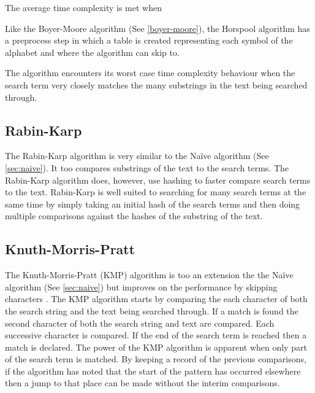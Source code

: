 \documentclass{article}
\begin{document}
The average time complexity is met when 

Like the Boyer-Moore algorithm \citep{Boyer1977} (See \ref{boyer-moore}), the Horspool algorithm has a preprocess step in which a table is created representing each symbol of the alphabet and where the algorithm can skip to.

The algorithm encounters its worst case time complexity behaviour when the search term very closely matches the many substrings in the text being searched through. 

\subsection{Rabin-Karp} \label{sec:rabin-karp}

The Rabin-Karp algorithm \citep{Karp1987} is very similar to the Na{\"i}ve algorithm (See \ref{sec:naive}). It too compares substrings of the text to the search terms. The Rabin-Karp algorithm does, however, use hashing to faster compare search terms to the text. Rabin-Karp is well suited to searching for many search terms at the same time by simply taking an initial hash of the search terms and then doing multiple comparisons against the hashes of the substring of the text.

\subsection{Knuth-Morris-Pratt} \label{sec:knuth-morris-pratt}

The Knuth-Morris-Pratt (KMP) algorithm \cite{Knuth1977} is too an extension the the Na{\"i}ve algorithm (See \ref{sec:naive}) but improves on the performance by skipping characters \citep{AbuHmed2007}. The KMP algorithm starts by comparing the each character of both the search string and the text being searched through. If a match is found the second character of both the search string and text are compared. Each successive character is compared. If the end of the search term is reached then a match is declared. The power of the KMP algorithm is apparent when only part of the search term is matched. By keeping a record of the previous comparisons, if the algorithm has noted that the start of the pattern has occurred elsewhere then a jump to that place can be made without the interim comparisons.
\end{document}
